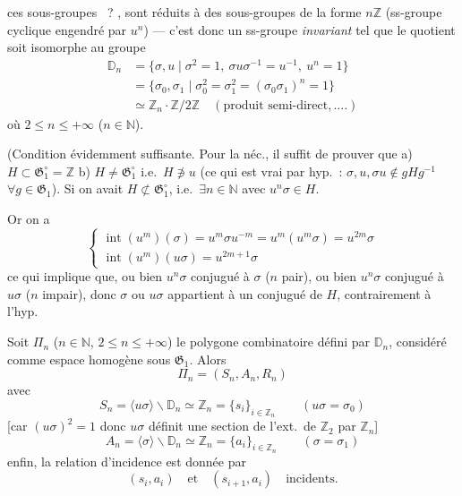 \documentclass[11pt,a4paper]{article}
\begin{document}
 ces sous-groupes ~? \struck{\ill{}}   , sont réduits  à des sous-groupes de la forme $n\mathbb{Z}$ (ss-groupe cyclique  engendré par $u^{n}$) \struck{\ill{}} --- c'est donc un ss-groupe \emph{invariant} tel que le quotient soit isomorphe au groupe
\[
  \begin{aligned}
    \mathbb{D}_n &= \{\sigma,u \mid \sigma^{2} = 1,\ \sigma u \sigma^{-1} = u^{-1},\ u^{n} = 1\} \\
    &= \{\sigma_0,\sigma_1 \mid \sigma_0^{2} = \sigma_1^{2} = (\sigma_0\sigma_1)^{n} = 1\} \\
    &\simeq \mathbb{Z}_n\cdot\mathbb{Z}/2\mathbb{Z} \quad (\text{produit semi-direct},\ldots.)
  \end{aligned}
\]
où $2 \leq n \leq +\infty$ \quad ($n \in \mathbb{N}$).

(Condition évidemment suffisante. Pour la néc., il suffit de prouver que a) $H \subset \mathfrak{G}_1^{\circ} = \mathbb{Z}$ \quad b) $H \neq \mathfrak{G}_1^{\circ}$ i.e.\ $H \not\ni u$ (ce qui est vrai par hyp.~: $\sigma, u, \sigma u \notin gHg^{-1}$ $\forall g \in \mathfrak{G}_1$). Si on avait $H \not\subset \mathfrak{G}_1^{\circ}$, i.e.\ $\exists n \in \mathbb{N}$ avec $u^{n}\sigma \in H$.

Or on a 
\[
  \begin{cases}
    \operatorname{int}(u^{m})(\sigma) = u^{m}\sigma u^{-m} = u^{m}(u^{m}\sigma) = u^{2m}\sigma \\
    \operatorname{int}(u^{m})(u\sigma) = u^{2m+1}\sigma
  \end{cases}
\]
ce qui implique que, ou bien $u^{n}\sigma$ conjugué à $\sigma$ ($n$ pair), ou bien $u^{n}\sigma$ conjugué à $u\sigma$ ($n$ impair), donc $\sigma$ ou $u\sigma$ appartient à un conjugué de $H$, contrairement à l'hyp.

Soit $\Pi_n$ ($n \in \mathbb{N}$, $2 \leq n \leq +\infty$) le polygone combinatoire défini par $\mathbb{D}_n$, considéré comme espace homogène sous $\mathfrak{G}_1$. Alors
\[
  \Pi_n = (S_n, A_n, R_n)
\]
avec
\[
  S_n = \langle u\sigma \rangle\backslash \mathbb{D}_n \simeq \mathbb{Z}_n = \{s_i\}_{i \in \mathbb{Z}_n}
  \qquad (u\sigma = \sigma_0)
\]
[car $(u\sigma)^{2} = 1$ donc $u\sigma$ définit une section de l'ext.\ de $\mathbb{Z}_2$ par $\mathbb{Z}_n$]
\[
  A_n = \langle\sigma\rangle\backslash \mathbb{D}_n \simeq \mathbb{Z}_n = \{a_i\}_{i \in \mathbb{Z}_n}
  \qquad (\sigma = \sigma_1)
\]
enfin, la relation d'incidence est donnée par
\[
  (s_i, a_i) \quad\text{et}\quad (s_{i+1}, a_i) \quad \text{incidents.}
\]
\end{document}
